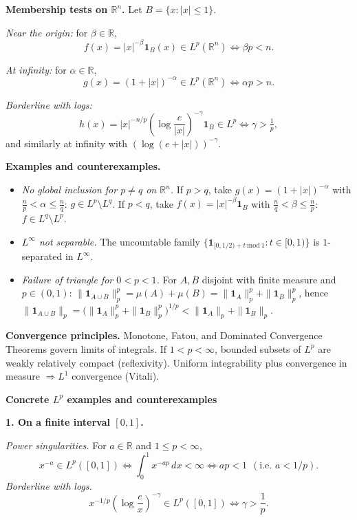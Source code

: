 \begin{problem}[CP-III-0010]
	\medskip
	\textbf{Membership tests on $\mathbb R^n$.}
	Let $B=\{x:|x|\le 1\}$.

	\emph{Near the origin:} for $\beta\in\mathbb R$,
	\[
	f(x)=|x|^{-\beta}\mathbf 1_{B}(x)\in L^p(\mathbb R^n)
	\iff \beta p < n.
	\]

	\emph{At infinity:} for $\alpha\in\mathbb R$,
	\[
	g(x)=(1+|x|)^{-\alpha}\in L^p(\mathbb R^n)
	\iff \alpha p > n.
	\]

	\emph{Borderline with logs:}
	\[
	h(x)=|x|^{-n/p}\!\left(\log\frac{e}{|x|}\right)^{-\gamma}\mathbf 1_{B}
	\in L^p \iff \gamma>\tfrac1p,
	\]
	and similarly at infinity with $\left(\log(e+|x|)\right)^{-\gamma}$.

	\medskip
	\textbf{Examples and counterexamples.}
	\begin{itemize}
		\item \emph{No global inclusion for $p\ne q$ on $\mathbb R^n$.}
		If $p>q$, take $g(x)=(1+|x|)^{-\alpha}$ with $\tfrac{n}{p}<\alpha\le\tfrac{n}{q}$:
		$g\in L^p\setminus L^q$.
		If $p<q$, take $f(x)=|x|^{-\beta}\mathbf 1_{B}$ with $\tfrac{n}{q}<\beta\le\tfrac{n}{p}$:
		$f\in L^q\setminus L^p$.
		\item \emph{$L^\infty$ not separable.}
		The uncountable family $\{\mathbf 1_{[0,1/2)+t\ \mathrm{mod}\ 1}:t\in[0,1)\}$ is $1$-separated in $L^\infty$.
		\item \emph{Failure of triangle for $0<p<1$.}
		For $A,B$ disjoint with finite measure and $p\in(0,1)$:
		$\|\mathbf 1_{A\cup B}\|_p^p=\mu(A)+\mu(B)=\|\mathbf 1_A\|_p^p+\|\mathbf 1_B\|_p^p$,
		hence $\|\mathbf 1_{A\cup B}\|_p=\big(\|\mathbf 1_A\|_p^p+\|\mathbf 1_B\|_p^p\big)^{1/p}
		< \|\mathbf 1_A\|_p+\|\mathbf 1_B\|_p$.
	\end{itemize}

	\textbf{Convergence principles.}
	Monotone, Fatou, and Dominated Convergence Theorems govern limits of integrals.
	If $1<p<\infty$, bounded subsets of $L^p$ are weakly relatively compact (reflexivity).
	Uniform integrability plus convergence in measure $\Rightarrow L^1$ convergence (Vitali).


	\par\medskip\noindent\textbf{Concrete $L^p$ examples and counterexamples}\quad

	\bigskip
	\textbf{1. On a finite interval $[0,1]$.}

	\medskip
	\emph{Power singularities.}
	For $a\in\mathbb{R}$ and $1\le p<\infty$,
	\[
	x^{-a}\in L^p([0,1])
	\iff \int_0^1 x^{-ap}\,dx <\infty
	\iff ap<1 \ \ (\text{i.e.\ } a<1/p).
	\]
	\emph{Borderline with logs.}
	\[
	x^{-1/p}\!\left(\log\frac{e}{x}\right)^{-\gamma}\in L^p([0,1])
	\iff \gamma>\frac1p.
	\]


\end{problem}
